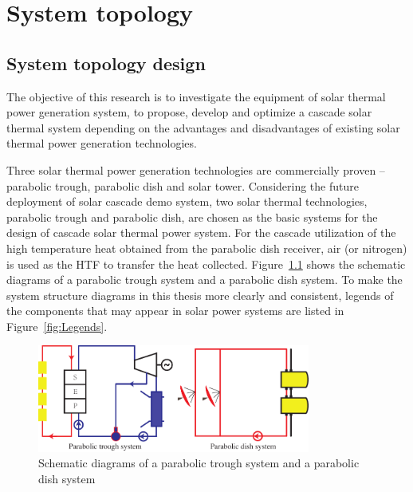 \chapter{System topology}
\label{cha:SystemTopology}
\section{System topology design}
\label{sec:std}

The objective of this research is to investigate the equipment of solar thermal power generation system, to propose, develop and optimize a cascade solar thermal system depending on the advantages and disadvantages of existing solar thermal power generation technologies. 

Three solar thermal power generation technologies are commercially proven -- parabolic trough, parabolic dish and solar tower. 
Considering the future deployment of solar cascade demo system, two solar thermal technologies, parabolic trough and parabolic dish, are chosen as the basic systems for the design of cascade solar thermal power system. For the cascade utilization of the high temperature heat obtained from the parabolic dish receiver, air (or nitrogen) is used as the HTF to transfer the heat collected.
Figure~\ref{fig:PTPD} shows the schematic diagrams of a parabolic trough system and a parabolic dish system. To make the system structure diagrams in this thesis more clearly and consistent, legends of the components that may appear in solar power systems are listed in Figure~\ref{fig:Legends}.

\begin{figure}[!ht]
\centering
\includegraphics[width=0.8\textwidth]{fig/PTPD.pdf}
\caption{Schematic diagrams of a parabolic trough system and a parabolic dish system}
\label{fig:PTPD}
\end{figure}

